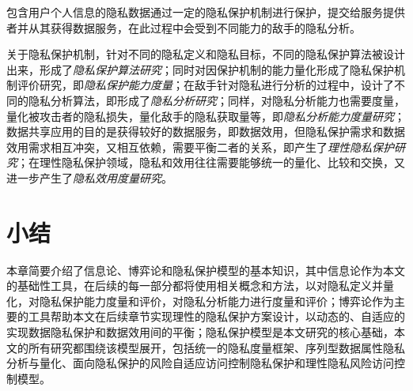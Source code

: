 包含用户个人信息的隐私数据通过一定的隐私保护机制进行保护，提交给服务提供者并从其获得数据服务，在此过程中会受到不同能力的敌手的隐私分析。

关于隐私保护机制，针对不同的隐私定义和隐私目标，不同的隐私保护算法被设计出来，形成了\textit{隐私保护算法研究}；同时对因保护机制的能力量化形成了隐私保护机制评价研究，即\textit{隐私保护能力度量}；在敌手针对隐私进行分析的过程中，设计了不同的隐私分析算法，即形成了\textit{隐私分析研究}；同样，对隐私分析能力也需要度量，量化被攻击者的隐私损失，量化敌手的隐私获取量等，即\textit{隐私分析能力度量研究}；数据共享应用的目的是获得较好的数据服务，即数据效用，但隐私保护需求和数据效用需求相互冲突，又相互依赖，需要平衡二者的关系，即产生了\textit{理性隐私保护研究}；在理性隐私保护领域，隐私和效用往往需要能够统一的量化、比较和交换，又进一步产生了\textit{隐私效用度量研究}。

\section{小结}

本章简要介绍了信息论、博弈论和隐私保护模型的基本知识，其中信息论作为本文的基础性工具，在后续的每一部分都将使用相关概念和方法，以对隐私定义并量化，对隐私保护能力度量和评价，对隐私分析能力进行度量和评价；博弈论作为主要的工具帮助本文在后续章节实现理性的隐私保护方案设计，以动态的、自适应的实现数据隐私保护和数据效用间的平衡；隐私保护模型是本文研究的核心基础，本文的所有研究都围绕该模型展开，包括统一的隐私度量框架、序列型数据属性隐私分析与量化、面向隐私保护的风险自适应访问控制隐私保护和理性隐私风险访问控制模型。